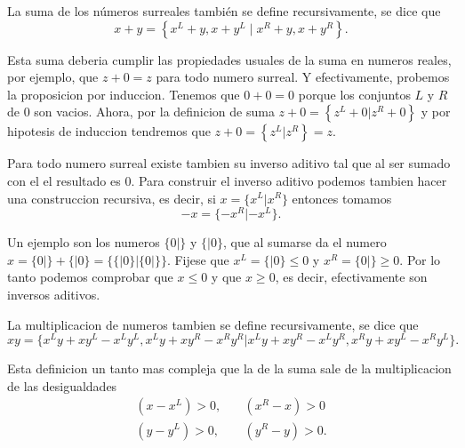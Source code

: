     La suma de los números surreales también se define recursivamente, se dice que
    \[
        x + y  = \left\{x^L+y, x+y^L\;|\;x^R+y, x+y^R\right\}.
    \]

    Esta suma deberia cumplir las propiedades usuales de la suma en numeros reales, por ejemplo, que $z+0=z$ para todo numero surreal. Y efectivamente, probemos la proposicion por induccion. Tenemos que $0+0 = 0$ porque los conjuntos $L$ y $R$ de $0$ son vacios. Ahora, por la definicion de suma $z+0 = \left\{z^L+0|z^R+0\right\}$ y por hipotesis de induccion tendremos que $z+0 = \left\{z^L|z^R\right\} = z$.

    Para todo numero surreal existe tambien su inverso aditivo tal que al ser sumado con el el resultado es $0$. Para construir el inverso aditivo podemos tambien hacer una construccion recursiva, es decir, si $x=\{x^L|x^R\}$ entonces tomamos 
    \[
        -x = \{-x^R|-x^L\}.
    \]

    Un ejemplo son los numeros $\{0|\}$ y $\{|0\}$, que al sumarse da el numero $x = \{0|\} + \{|0\} = \{\{|0\}|\{0|\}\}$. Fijese que $x^L = \{|0\}\le 0$ y $x^R = \{0|\}\ge 0$. Por lo tanto podemos comprobar que $x\le 0$ y que $x \ge 0$, es decir, efectivamente son inversos aditivos.

    La multiplicacion de numeros tambien se define recursivamente, se dice que
    \[
        xy = \{x^Ly+xy^L-x^Ly^L, x^Ly+xy^R-x^Ry^R| x^Ly+xy^R-x^Ly^R, x^Ry+xy^L-x^Ry^L\}.
    \]

    Esta definicion un tanto mas compleja que la de la suma sale de la multiplicacion de las desigualdades
    \begin{align*}
        (x-x^L) > 0, \quad & (x^R-x)>0 \\
        (y-y^L) > 0, \quad & (y^R-y)>0.
    \end{align*}
    